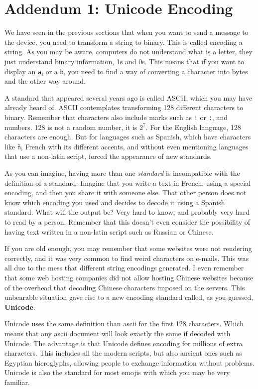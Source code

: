 \section{Addendum 1: Unicode Encoding}\label{section:unicode}
We have seen in the previous sections that when you want to send a message to the device, you need to transform a string to binary. This is called encoding a 
string. As you may be aware, computers do not understand what is a letter, they just understand binary information, 1s and 0s. This means that if you want to display an \texttt{a}, or a \texttt{b}, you need to find a way of converting a 
character into bytes and the other way around. 

A standard that appeared several years ago is called ASCII, which you may have already heard of. ASCII contemplates transforming 128 different characters to binary. Remember that characters also include marks such as \texttt{!} or 
\texttt{:}, and numbers. 128 is not a random number, it is $2^7$. For the English language, 128 characters are enough. But for languages such as Spanish, which have characters like \texttt{ñ}, French with its different accents, and without even mentioning languages that use a non-latin script, forced the appearance of new standards. 

As you can imagine, having more than one \textit{standard} is incompatible with the definition of a standard. Imagine that you write a text in French, using a special encoding, and then you share it with someone else. That other person does not know which encoding you used and decides to decode it using a Spanish standard. 
What will the output be? Very hard to know, and probably very hard to read by a person. 
Remember that this doesn't even consider the possibility of having text 
written in a non-latin script such as Russian or Chinese.

If you are old enough, you may remember that some websites were not rendering correctly, and it was very common to find weird characters on e-mails. This was all due to the mess that different string encodings generated. I even remember that some web hosting companies did not allow hosting Chinese websites because of the overhead that decoding Chinese characters imposed on the servers. This unbearable situation gave rise to a new encoding standard called, as you guessed, 
\textbf{Unicode}. 

Unicode uses the same definition than ascii for the first 128 characters. Which means that any ascii document will look exactly the same if decoded with 
Unicode. The advantage is that Unicode defines encoding for millions of extra characters. This includes all the modern scripts, but also ancient ones such as 
Egyptian hieroglyphs, allowing people to exchange information without problems. Unicode is also the standard for most emojis with which you may be very familiar. 

